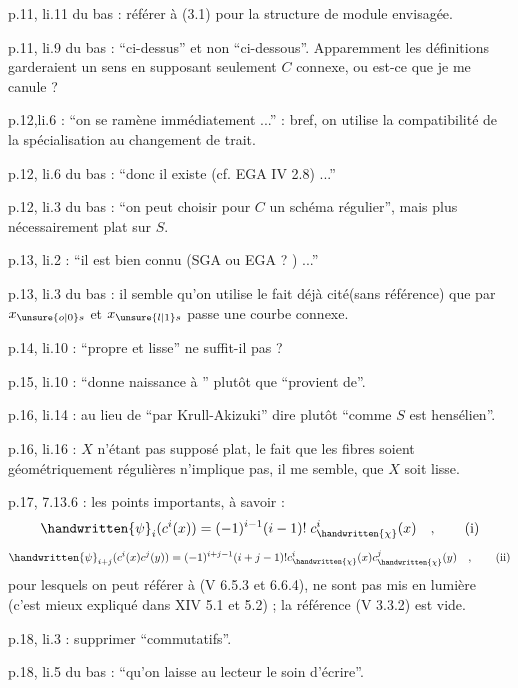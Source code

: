 p.11, li.11 du bas : référer à (3.1) pour la structure de module envisagée.

p.11, li.9 du bas : ``ci-dessus'' et non ``ci-dessous''. Apparemment les définitions garderaient un sens en supposant seulement $C$ connexe, ou est-ce que je me canule ?

p.12,li.6 : ``on se ramène immédiatement ...'' : bref, on utilise la compatibilité de la spécialisation au changement de trait.

p.12, li.6 du bas : ``donc il existe (cf. EGA IV 2.8) ...''

p.12, li.3 du bas : ``on peut choisir pour $C$ un schéma régulier'', mais plus nécessairement plat sur $S$.

p.13, li.2 : ``il est bien connu (SGA ou EGA ? ) ...''


p.13, li.3 du bas : il semble qu'on utilise le fait déjà cité(sans référence) que par $x_{\unsure{o|0}s}$ et $x_{\unsure{l|1}s}$ passe une courbe connexe.

p.14, li.10 : ``propre et lisse'' ne suffit-il pas ?

p.15, li.10 : ``donne naissance à '' plutôt que ``provient de''.

p.16, li.14 : au lieu de ``par Krull-Akizuki'' dire plutôt ``comme $S$ est hensélien''.

p.16, li.16 : $X$ n'étant pas supposé plat, le fait que les fibres soient géométriquement régulières n'implique pas, il me semble, que $X$ soit lisse.


p.17, 7.13.6 : les points importants, à savoir :
\begingroup
\makeatletter\tagsleft@true\makeatother
\[
\handwritten{\psi}_i(c^i(x)) = (-1)^{i-1}(i-1)!\;c^i_{\handwritten{\chi}}(x)\quad,\tag*{(i)}
\]
\[
\handwritten{\psi}_{i+j}(c^i(x)c^j(y)) = (-1)^{i+j-1}(i+j-1)!c^i_{\handwritten{\chi}}(x)c^j_{\handwritten{\chi}}(y)\quad,\tag*{(ii)}
\]
\endgroup
pour lesquels on peut référer à (V 6.5.3 et 6.6.4), ne sont pas
 mis en lumière (c'est mieux expliqué dans XIV 5.1 et 5.2) ; la référence (V 3.3.2) est vide.

p.18, li.3 : supprimer ``commutatifs''.

p.18, li.5 du bas : ``qu'on laisse au lecteur le soin d'écrire''.

